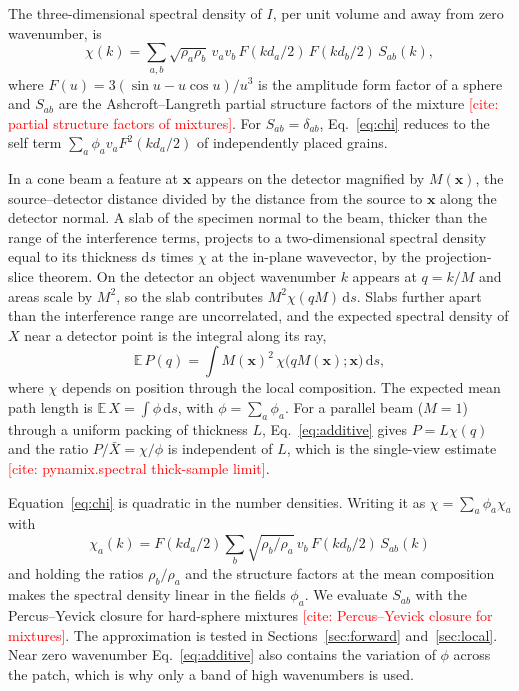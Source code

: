 \documentclass[11pt]{article}
\newcommand{\todo}[1]{\textcolor{red}{[#1]}}
\newcommand{\dd}{\mathrm{d}}
\newcommand{\x}{\bm{x}}
\begin{document}
The three-dimensional spectral density of $I$, per unit volume and away from
zero wavenumber, is
\begin{equation}
\chi(k)=\sum_{a,b}\sqrt{\rho_a\rho_b}\,v_a v_b\,F(k d_a/2)\,F(k d_b/2)\,S_{ab}(k),
\label{eq:chi}
\end{equation}
where $F(u)=3(\sin u-u\cos u)/u^3$ is the amplitude form factor of a sphere
and $S_{ab}$ are the Ashcroft--Langreth partial structure factors of the
mixture \todo{cite: partial structure factors of mixtures}. For
$S_{ab}=\delta_{ab}$, Eq.~\eqref{eq:chi} reduces to the self term
$\sum_a\phi_a v_aF^2(kd_a/2)$ of independently placed grains.

In a cone beam a feature at $\x$ appears on the detector magnified by
$M(\x)$, the source--detector distance divided by the distance from the
source to $\x$ along the detector normal. A slab of the specimen normal to
the beam, thicker than the range of the interference terms, projects to a
two-dimensional spectral density equal to its thickness $\dd s$ times $\chi$
at the in-plane wavevector, by the projection-slice theorem. On the detector
an object wavenumber $k$ appears at $q=k/M$ and areas scale by $M^2$, so the
slab contributes $M^2\chi(qM)\,\dd s$. Slabs further apart than the
interference range are uncorrelated, and the expected spectral density of
$X$ near a detector point is the integral along its ray,
\begin{equation}
\mathbb{E}\,P(q)=\int M(\x)^2\,\chi\bigl(qM(\x);\x\bigr)\,\dd s,
\label{eq:additive}
\end{equation}
where $\chi$ depends on position through the local composition. The expected
mean path length is $\mathbb{E}\,X=\int\phi\,\dd s$, with $\phi=\sum_a\phi_a$.
For a parallel beam ($M=1$) through a uniform packing of thickness $L$,
Eq.~\eqref{eq:additive} gives $P=L\chi(q)$ and the ratio $P/\bar X=\chi/\phi$
is independent of $L$, which is the single-view estimate
\todo{cite: pynamix.spectral thick-sample limit}.

Equation~\eqref{eq:chi} is quadratic in the number densities. Writing it as
$\chi=\sum_a\phi_a\chi_a$ with
\begin{equation}
\chi_a(k)=F(kd_a/2)\sum_b\sqrt{\rho_b/\rho_a}\,v_b\,F(kd_b/2)\,S_{ab}(k)
\label{eq:chia}
\end{equation}
and holding the ratios $\rho_b/\rho_a$ and the structure factors at the mean
composition makes the spectral density linear in the fields $\phi_a$. We
evaluate $S_{ab}$ with the Percus--Yevick closure for hard-sphere mixtures
\todo{cite: Percus--Yevick closure for mixtures}. The approximation is
tested in Sections~\ref{sec:forward} and~\ref{sec:local}. Near zero
wavenumber Eq.~\eqref{eq:additive} also contains the variation of $\phi$
across the patch, which is why only a band of high wavenumbers is used.
\end{document}
